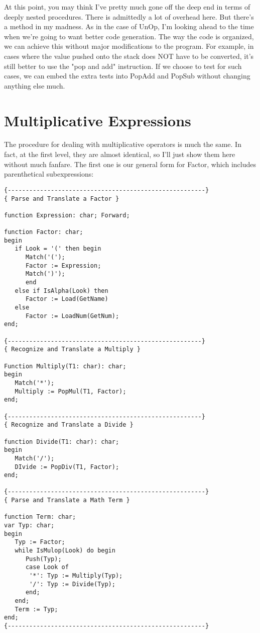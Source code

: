 At this point, you may think  I've  pretty much gone off the deep end in terms of deeply nested procedures. There is  admittedly a lot of overhead here. But there's a method in my madness. As in the case of UnOp, I'm looking ahead to the time when  we're going to want better code  generation. The way the code is organized, we can achieve  this  without major modifications to the program. For example, in cases where the value pushed onto the  stack does  NOT  have to be converted, it's still better to use the "pop and add"  instruction. If we choose to test for such cases, we can embed the extra tests into  PopAdd  and  PopSub  without changing anything else much.

\section{Multiplicative Expressions}

The procedure for dealing with multiplicative  operators  is much the  same. In  fact, at  the  first  level, they are  almost identical, so I'll just show them here without much fanfare. The first  one  is  our  general  form  for  Factor, which  includes parenthetical subexpressions:

\begin{verbatim}
{-------------------------------------------------------}
{ Parse and Translate a Factor }

function Expression: char; Forward;

function Factor: char;
begin
   if Look = '(' then begin
      Match('(');
      Factor := Expression;
      Match(')');
      end
   else if IsAlpha(Look) then
      Factor := Load(GetName)
   else
      Factor := LoadNum(GetNum);
end;

{------------------------------------------------------}
{ Recognize and Translate a Multiply }

Function Multiply(T1: char): char;
begin
   Match('*');
   Multiply := PopMul(T1, Factor);
end;

{------------------------------------------------------}
{ Recognize and Translate a Divide }

function Divide(T1: char): char;
begin
   Match('/');
   DIvide := PopDiv(T1, Factor);
end;

{-------------------------------------------------------}
{ Parse and Translate a Math Term }

function Term: char;
var Typ: char;
begin
   Typ := Factor;
   while IsMulop(Look) do begin
      Push(Typ);
      case Look of
       '*': Typ := Multiply(Typ);
       '/': Typ := Divide(Typ);
      end;
   end;
   Term := Typ;
end;
{-------------------------------------------------------}
\end{verbatim}

